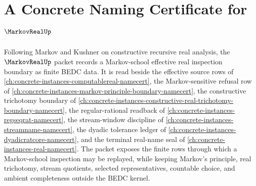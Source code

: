 \chapter{A Concrete Naming Certificate for $\MarkovRealUp$}
\label{ch:concrete-instances-markov-real-namecert}

Following Markov and Kushner on constructive recursive real analysis, the $\MarkovRealUp$ packet records a Markov-school effective real inspection boundary as finite BEDC data. It is read beside the effective source rows of \autoref{ch:concrete-instances-computablereal-namecert}, the Markov-sensitive refusal row of \autoref{ch:concrete-instances-markov-principle-boundary-namecert}, the constructive trichotomy boundary of \autoref{ch:concrete-instances-constructive-real-trichotomy-boundary-namecert}, the regular-rational readback of \autoref{ch:concrete-instances-regseqrat-namecert}, the stream-window discipline of \autoref{ch:concrete-instances-streamname-namecert}, the dyadic tolerance ledger of \autoref{ch:concrete-instances-dyadicratcore-namecert}, and the terminal real-name seal of \autoref{ch:concrete-instances-real-namecert}. The packet exposes the finite rows through which a Markov-school inspection may be replayed, while keeping Markov's principle, real trichotomy, stream quotients, selected representatives, countable choice, and ambient completeness outside the BEDC kernel.

